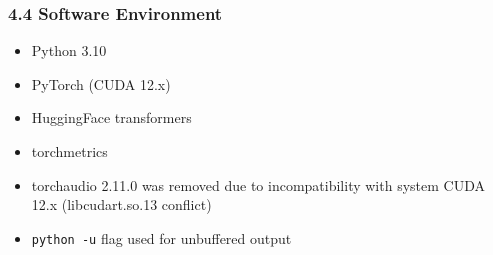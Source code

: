 \subsubsection{4.4 Software Environment}

\begin{itemize}
\item Python 3.10
\item PyTorch (CUDA 12.x)
\item HuggingFace transformers
\item torchmetrics
\item torchaudio 2.11.0 was removed due to incompatibility with system CUDA 12.x (libcudart.so.13 conflict)
\item \texttt{python -u} flag used for unbuffered output
\end{itemize}

